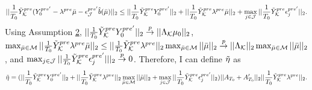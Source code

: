 \documentclass{article}
\begin{document}
\begin{equation*}
    ||\frac{1}{T_0}\Tilde{Y}_{\mathcal{K}}^{pre}(Y_{0}^{pre'} -\lambda^{pre}\Bar{\mu} - \epsilon_{\mathcal{J}}^{pre'}\hat{b}(\Bar{\mu})||_2  \leq ||\frac{1}{T_0}\Tilde{Y}_{\mathcal{K}}^{pre}Y_{0}^{pre'}||_2 + ||\frac{1}{T_0}\Tilde{Y}_{\mathcal{K}}^{pre}\lambda^{pre}\Bar{\mu}||_2 +  \max_{j \in \mathcal{J}}||\frac{1}{T_0}\Tilde{Y}_{\mathcal{K}}^{pre}\epsilon_{j}^{pre'}||_2.
\end{equation*}
Using Assumption \hyperref[A2]{2}, $ ||\frac{1}{T_0}\Tilde{Y}_{\mathcal{K}}^{pre}Y_{0}^{pre'}||_2 \overset{p}{\rightarrow} ||\Lambda_{\mathcal{K}} \mu_0||_2$, $\max_{\Bar{\mu} \in \mathcal{M}}||\frac{1}{T_0}\Tilde{Y}_{\mathcal{K}}^{pre}\lambda^{pre}\Bar{\mu}||_2 \leq ||\frac{1}{T_0}\Tilde{Y}_{\mathcal{K}}^{pre}\lambda^{pre}||_2 \max_{\Bar{\mu} \in \mathcal{M}} ||\Bar{\mu}||_2 \overset{p}{\rightarrow} ||\Lambda_{\mathcal{K}}||_2 \max_{\Bar{\mu} \in \mathcal{M}} ||\Bar{\mu}||_2$, and $\max_{j \in \mathcal{J}}||\frac{1}{T_0}\Tilde{Y}_{\mathcal{K}}^{pre}\epsilon_{j}^{pre'}|||_2 \overset{p}{\rightarrow} 0$. Therefore, I can define $\Tilde{\eta}$ as
\begin{equation*}
    \Tilde{\eta} = (||\frac{1}{T_0}\Tilde{Y}_{\mathcal{K}}^{pre}Y_{0}^{pre'}||_2 + ||\frac{1}{T_0}\Tilde{Y}_{\mathcal{K}}^{pre}\lambda^{pre}||_2 \max_{\Bar{\mu} \in \mathcal{M}} ||\Bar{\mu}||_2 +  \max_{j \in \mathcal{J}}||\frac{1}{T_0}\Tilde{Y}_{\mathcal{K}}^{pre}\epsilon_{j}^{pre'}||_2)||A_{T_0} + A_{T_0}'||_2 ||\frac{1}{T_0}\Tilde{Y}_{\mathcal{K}}^{pre} \lambda^{pre}||_2.
\end{equation*}
\end{document}
